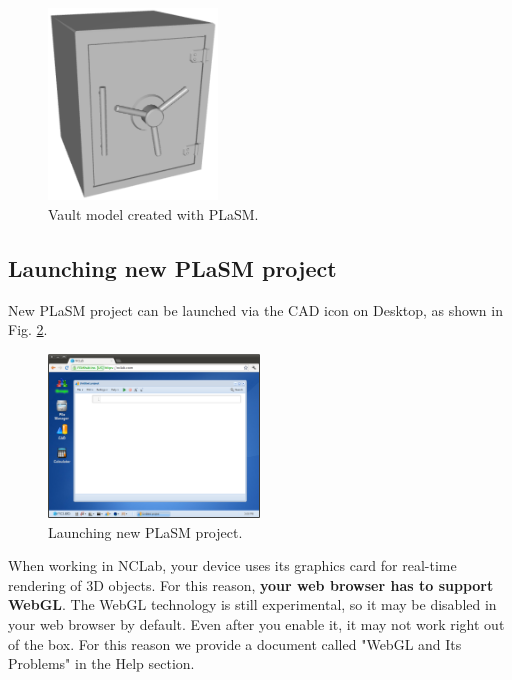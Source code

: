 \begin{figure}[!ht]
\begin{center}
\includegraphics[width=0.4\textwidth]{img/vault.png}
\end{center}
\vspace{-4mm}
\caption{Vault model created with PLaSM.}
\label{fig:vault0}
\end{figure}


\subsection{Launching new PLaSM project}


New PLaSM project can be launched via the CAD icon on Desktop, as shown 
in Fig. \ref{fig:python}.

\begin{figure}[!ht]
\begin{center}
\includegraphics[width=0.5\textwidth]{img/python.png}
\end{center}
\vspace{-2mm}
\caption{Launching new PLaSM project.}
\label{fig:python}
\end{figure}
\noindent
When working in NCLab, your device uses
its graphics card for real-time rendering of 3D objects. For this 
reason, {\bf your web browser has to support WebGL}. 
The WebGL technology is still experimental, so it may be disabled 
in your web browser by default. Even after you enable it, it may not work 
right out of the box. For this reason we provide a document called 
"WebGL and Its Problems" in the Help section.

